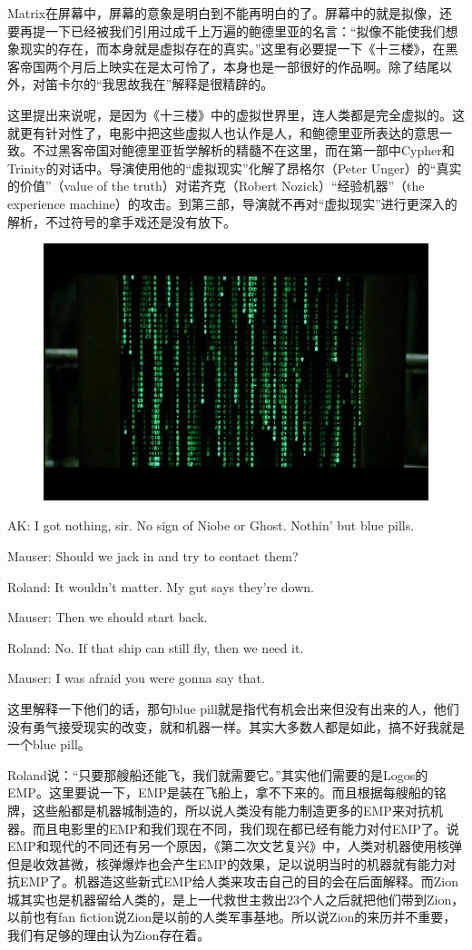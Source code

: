 \documentclass[UTF8]{ctexart}
\newenvironment{myquote}{\color{green} \setlength{\leftskip}{6em} \setlength{\rightskip}{4em} \setlength{\parindent}{-2em}}{\par}
\begin{document}
Matrix在屏幕中，屏幕的意象是明白到不能再明白的了。屏幕中的就是拟像，还要再提一下已经被我们引用过成千上万遍的鲍德里亚的名言：“拟像不能使我们想象现实的存在，而本身就是虚拟存在的真实。”这里有必要提一下《十三楼》，在黑客帝国两个月后上映实在是太可怜了，本身也是一部很好的作品啊。除了结尾以外，对笛卡尔的“我思故我在”解释是很精辟的。

这里提出来说呢，是因为《十三楼》中的虚拟世界里，连人类都是完全虚拟的。这就更有针对性了，电影中把这些虚拟人也认作是人，和鲍德里亚所表达的意思一致。不过黑客帝国对鲍德里亚哲学解析的精髓不在这里，而在第一部中Cypher和Trinity的对话中。导演使用他的“虚拟现实”化解了昂格尔（Peter Unger）的“真实的价值”（value of the truth）对诺齐克（Robert Nozick）“经验机器”（the experience machine）的攻击。到第三部，导演就不再对“虚拟现实”进行更深入的解析，不过符号的拿手戏还是没有放下。

\begin{figure}[htb]
\centering
\includegraphics[width=0.5\linewidth]{fig/a698838bba0ca1d3fd1f1010.jpg}
\end{figure}

\begin{myquote}
AK: I got nothing, sir. No sign of Niobe or Ghost. Nothin' but blue pills.

Mauser: Should we jack in and try to contact them?

Roland: It wouldn't matter. My gut says they're down.

Mauser: Then we should start back.

Roland: No. If that ship can still fly, then we need it.

Mauser: I was afraid you were gonna say that.
\end{myquote}

这里解释一下他们的话，那句blue pill就是指代有机会出来但没有出来的人，他们没有勇气接受现实的改变，就和机器一样。其实大多数人都是如此，搞不好我就是一个blue pill。

Roland说：“只要那艘船还能飞，我们就需要它。”其实他们需要的是Logos的EMP。这里要说一下，EMP是装在飞船上，拿不下来的。而且根据每艘船的铭牌，这些船都是机器城制造的，所以说人类没有能力制造更多的EMP来对抗机器。而且电影里的EMP和我们现在不同，我们现在都已经有能力对付EMP了。说EMP和现代的不同还有另一个原因，《第二次文艺复兴》中，人类对机器使用核弹但是收效甚微，核弹爆炸也会产生EMP的效果，足以说明当时的机器就有能力对抗EMP了。机器造这些新式EMP给人类来攻击自己的目的会在后面解释。而Zion城其实也是机器留给人类的，是上一代救世主救出23个人之后就把他们带到Zion，以前也有fan fiction说Zion是以前的人类军事基地。所以说Zion的来历并不重要，我们有足够的理由认为Zion存在着。
\end{document}
